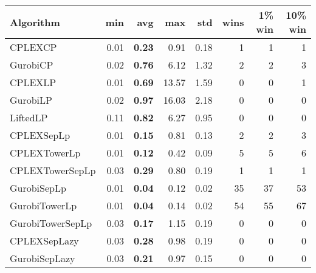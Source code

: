 \begin{tabular}{lrrrrrrr}
Algorithm & min & avg & max & std
& wins & 1\% win & 10\% win 
\\
\hline
CPLEXCP&0.01& \bf0.23& 0.91& 0.18&1&1&1\\
GurobiCP&0.02& \bf0.76& 6.12& 1.32&2&2&3\\
CPLEXLP&0.01& \bf0.69& 13.57& 1.59&0&0&1\\
GurobiLP&0.02& \bf0.97& 16.03& 2.18&0&0&0\\
LiftedLP&0.11& \bf0.82& 6.27& 0.95&0&0&0\\
CPLEXSepLp&0.01& \bf0.15& 0.81& 0.13&2&2&3\\
CPLEXTowerLp&0.01& \bf0.12& 0.42& 0.09&5&5&6\\
CPLEXTowerSepLp&0.03& \bf0.29& 0.80& 0.19&1&1&1\\
GurobiSepLp&0.01& \bf0.04& 0.12& 0.02&35&37&53\\
GurobiTowerLp&0.01& \bf0.04& 0.14& 0.02&54&55&67\\
GurobiTowerSepLp&0.03& \bf0.17& 1.15& 0.19&0&0&0\\
CPLEXSepLazy&0.03& \bf0.28& 0.98& 0.19&0&0&0\\
GurobiSepLazy&0.03& \bf0.21& 0.97& 0.15&0&0&0
\end{tabular}
